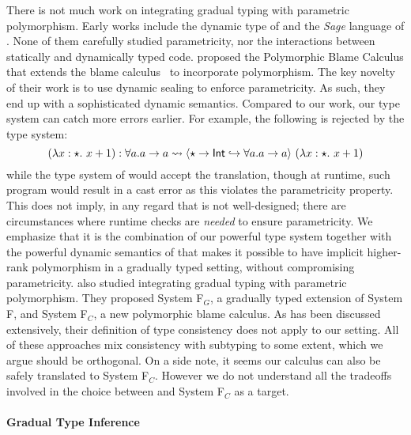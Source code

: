 There is not much work on integrating gradual typing with parametric
polymorphism. Early works include the dynamic type of
\citet{abadi1995dynamic} and
the \textit{Sage} language of \citet{gronski2006sage}. None of them carefully
studied parametricity, nor the interactions between statically and dynamically
typed code. \citet{ahmed2011blame} proposed the Polymorphic Blame Calculus that
extends the blame calculus~\cite{Wadler_2009} to incorporate polymorphism. The
key novelty of their work is to use dynamic sealing to enforce parametricity. As
such, they end up with a sophisticated dynamic semantics. Compared to our
work, our type system can catch more errors earlier. For example, the following
is rejected by the type system:
\[
  (\lambda x:\star.~ x + 1) : \forall a. a \to a \rightsquigarrow \langle \star \to \mathsf{Int} \hookrightarrow \forall a. a \to a \rangle ~ (\lambda x:\star.~ x + 1)
\]
while the type system of \pbc would accept the translation, though at runtime,
such program would result in a cast error as this violates the parametricity
property. This does not imply, in any regard that \pbc is not well-designed;
there are circumstances where runtime checks are \textit{needed} to ensure
parametricity. We emphasize that it is the combination of our powerful type
system together with the powerful dynamic semantics of \pbc that makes it
possible to have implicit higher-rank polymorphism in a gradually typed setting,
without compromising parametricity. \citet{yuu2017poly} also studied integrating
gradual typing with parametric polymorphism. They proposed System F$_G$, a
gradually typed extension of System F, and System F$_C$, a new polymorphic blame
calculus. As has been discussed extensively, their definition of type consistency
does not apply to our setting. All of these approaches mix consistency with
subtyping to some extent, which we argue should be orthogonal. On a side note,
it seems our calculus can also be safely translated to System F$_C$. However we
do not understand all the tradeoffs involved in the choice between \pbc and
System F$_C$ as a target.



\paragraph{Gradual Type Inference}

